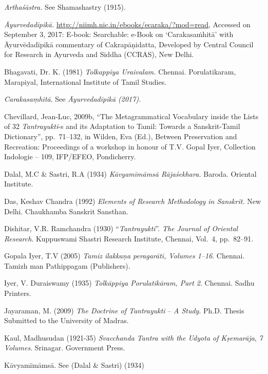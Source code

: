 \begin{thebibliography}{99}
 \textit{Arthaśāstra.} See Shamashastry (1915).

  \textit{Āyurvedadīpikā.} \url{http://niimh.nic.in/ebooks/ecaraka/?mod=read}, Accessed on September 3, 2017: E-book: Searchable: e-Book on ‘Carakasaṁhitā’ with Āyurvēdadīpikā commentary of Cakrapāṇidatta, Developed by Central Council for Research in Ayurveda and Siddha (CCRAS), New Delhi.

  Bhagavati, Dr. K. (1981) \textit{Tolkappiya Uraivalam.} Chennai. Porulatikaram, Marapiyal, International Institute of Tamil Studies.

  \textit{Carakasaṃhitā}. See \textit{Āyurvedadīpikā (2017).}

  Chevillard, Jean-Luc, 2009b, “The Metagrammatical Vocabulary inside the Lists of 32 \textit{Tantrayukti}-s and its Adaptation to Tamil: Towards a Sanskrit-Tamil Dictionary”, pp.~71--132, in Wilden, Eva (Ed.), Between Preservation and Recreation: Proceedings of a workshop in honour of T.V. Gopal Iyer, Collection Indologie – 109, IFP/EFEO, Pondicherry.

  Dalal, M.C \& Sastri, R.A (1934) \textit{Kāvyamīmāmsā Rājaśekhara.} Baroda. Oriental Institute.

  Das, Keshav Chandra (1992) \textit{Elements of Research Methodology in Sanskrit.} New Delhi. Chaukhamba Sanskrit Sansthan.

  Dishitar, V.R. Ramchandra (1930) “\textit{Tantrayukti}”. \textit{The Journal of Oriental Research}. Kuppuswami Shastri Research Institute, Chennai, Vol.~4, pp.~82--91.

  Gopala Iyer, T.V (2005) \textit{Tamiz ilakkaṇa peragarāti, Volumes 1--16}. Chennai. Tamizh man Pathippagam (Publishers).

  Iyer, V. Duraiswamy (1935) \textit{Tolkāppiya Porulatikāram, Part 2}. Chennai. Sadhu Printers.

  Jayaraman, M. (2009) \textit{The Doctrine of Tantrayukti} – \textit{A Study}. Ph.D. Thesis Submitted to the University of Madras.

  Kaul, Madhusudan (1921-35) \textit{Svacchanda Tantra with the Udyota of Kṣemarāja}, \textit{7 Volumes}. Srinagar. Government Press.

  Kāvyamīmāmsā. See (Dalal \& Sastri) (1934)


\end{thebibliography}
